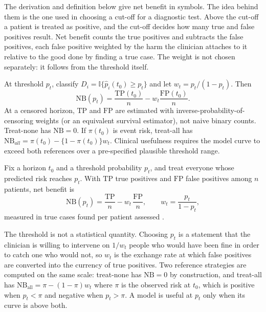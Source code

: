 The derivation and definition below give net benefit in symbols. The idea behind them is the one used in choosing a cut-off for a diagnostic test. Above the cut-off a patient is treated as positive, and the cut-off decides how many true and false positives result. Net benefit counts the true positives and subtracts the false positives, each false positive weighted by the harm the clinician attaches to it relative to the good done by finding a true case. The weight is not chosen separately: it follows from the threshold itself.

\begin{derivation}
\label{der:netbenefit}
At threshold $p_t$, classify $D_i=\mathbb I\{\widehat p_i(t_0)\geq p_t\}$ and let
$w_t=p_t/(1-p_t)$. Then
\[
 \mathrm{NB}(p_t)=\frac{\mathrm{TP}(t_0)}{n}-
 w_t\frac{\mathrm{FP}(t_0)}{n}.
\]
At a censored horizon, $\mathrm{TP}$ and $\mathrm{FP}$ are estimated with
inverse-probability-of-censoring weights (or an equivalent survival estimator),
not naive binary counts. Treat-none has $\mathrm{NB}=0$. If $\pi(t_0)$ is event
risk, treat-all has
$\mathrm{NB}_{all}=\pi(t_0)-\{1-\pi(t_0)\}w_t$.
Clinical usefulness requires the model curve to exceed both references over a
pre-specified plausible threshold range.
\end{derivation}

\begin{definition}
\label{def:prog2:netbenefit}
Fix a horizon $t_0$ and a threshold probability $p_t$, and treat everyone whose
predicted risk reaches $p_t$. With $\mathrm{TP}$ true positives and
$\mathrm{FP}$ false positives among $n$ patients, net benefit is
\begin{equation}
  \mathrm{NB}(p_t)=\frac{\mathrm{TP}}{n}-w_t\,\frac{\mathrm{FP}}{n},
  \qquad w_t=\frac{p_t}{1-p_t},
  \label{eq:netbenefit}
\end{equation}
measured in true cases found per patient assessed \citep{vickers_elkin_2006}.

The threshold is not a statistical quantity. Choosing $p_t$ is a statement that
the clinician is willing to intervene on $1/w_t$ people who would have been
fine in order to catch one who would not, so $w_t$ is the exchange rate at
which false positives are converted into the currency of true positives. Two
reference strategies are computed on the same scale: treat-none has
$\mathrm{NB}=0$ by construction, and treat-all has
$\mathrm{NB}_{\mathrm{all}}=\pi-(1-\pi)w_t$ where $\pi$ is the observed risk at
$t_0$, which is positive when $p_t<\pi$ and negative when $p_t>\pi$. A model is
useful at $p_t$ only when its curve is above both.
\end{definition}

